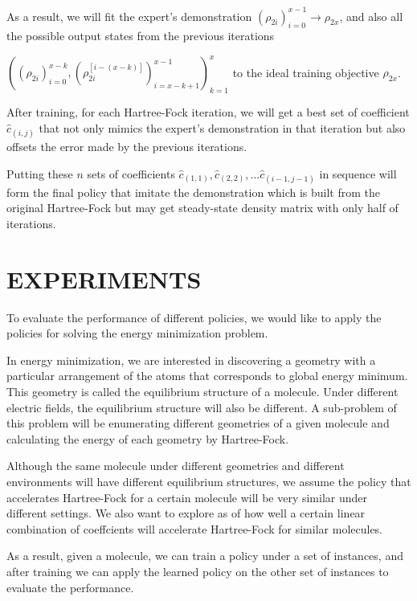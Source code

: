\documentclass[twoside,11pt]{article}
\begin{document}
As a result, we will fit the expert's demonstration $(\rho_{2i})_{i=0}^{x-1} \rightarrow \rho_{2x}$, and also all the possible output states from the previous iterations 

$((\rho_{2i})_{i=0}^{x-k} ,(\rho_{2i}^{[i-(x-k)]})^{x-1}_{i=x-k+1})_{k=1}^{x}$  
to the ideal training objective $\rho_{2x}$.
%

After training, for each Hartree-Fock iteration, we will get a best set of coefficient $\hat{c}_{(i,j)}$ that not only mimics the expert's demonstration in that iteration but also offsets the error made by the previous iterations.

% 
Putting these $n$ sets of coefficients $\hat{c}_{(1,1)}, \hat{c}_{(2,2)}, \ldots  \hat{c}_{(i-1,j-1)}$ in sequence will form the final policy that imitate the demonstration which is built from  the original Hartree-Fock but may get steady-state density matrix with only half of iterations. 


\section{EXPERIMENTS}

To evaluate the performance of different policies, we would like to apply the policies for solving the energy minimization problem.

In energy minimization, we are interested in discovering a geometry with a particular arrangement of the atoms that corresponds to global energy minimum. This geometry is called the equilibrium structure of a molecule. Under different electric fields, the equilibrium structure will also be different. A sub-problem of this problem will be enumerating different geometries of a given molecule and calculating the energy of each geometry by Hartree-Fock. 

 
Although the same molecule under different geometries and different environments will have different equilibrium structures, we assume the policy that accelerates Hartree-Fock for a certain molecule will be very similar under different settings. We also want to explore as of how well a certain linear combination of coeffcients will accelerate Hartree-Fock for similar molecules.  

As a result, given a molecule, we can train a policy under a set of instances, and after training we can apply the learned policy on the other set of instances to evaluate the performance. 
 
\end{document}
